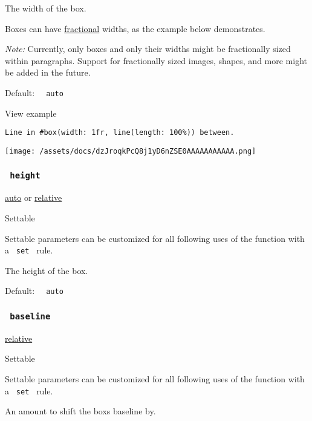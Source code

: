 The width of the box.

Boxes can have \href{/docs/reference/layout/fraction/}{fractional}
widths, as the example below demonstrates.

\emph{Note:} Currently, only boxes and only their widths might be
fractionally sized within paragraphs. Support for fractionally sized
images, shapes, and more might be added in the future.

Default: \texttt{\ }{\texttt{\ auto\ }}\texttt{\ }


View example

\begin{verbatim}
Line in #box(width: 1fr, line(length: 100%)) between.
\end{verbatim}

\texttt{[image: /assets/docs/dzJroqkPcQ8j1yD6nZSE0AAAAAAAAAAA.png]}

\subsubsection{\texorpdfstring{\texttt{\ height\ }}{ height }}\label{parameters-height}

\href{/docs/reference/foundations/auto/}{auto} {or}
\href{/docs/reference/layout/relative/}{relative}

{{ Settable }}

\label{parameters-height-settable-tooltip}
Settable parameters can be customized for all following uses of the
function with a \texttt{\ set\ } rule.

The height of the box.

Default: \texttt{\ }{\texttt{\ auto\ }}\texttt{\ }

\subsubsection{\texorpdfstring{\texttt{\ baseline\ }}{ baseline }}\label{parameters-baseline}

\href{/docs/reference/layout/relative/}{relative}

{{ Settable }}

\label{parameters-baseline-settable-tooltip}
Settable parameters can be customized for all following uses of the
function with a \texttt{\ set\ } rule.

An amount to shift the box\textquotesingle s baseline by.


